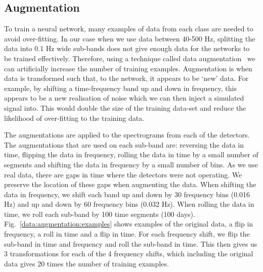 \subsection{\label{data:augmentation} Augmentation}

%
To train a neural network, many examples of data from each class are needed to avoid over-fitting.
In our case when we use data between 40-500 Hz, splitting the data into 0.1 Hz wide sub-bands does not give enough data for the
networks to be trained effectively. Therefore, using a technique called data
augmentation~\cite{patrice1991TangentProp,baird1992DocumentImage} we can
artificially increase the number of training examples.
Augmentation is when data is transformed such that, to the network, it appears to be `new'
data. 
For example, by shifting a time-frequency band up and down in frequency, this appears to be a new realisation of noise which we can then inject a simulated signal into.
This would double the size of the training data-set and reduce the likelihood of over-fitting to the training data. 

%
The augmentations are applied to the spectrograms from each of the detectors.
The augmentations that are used on each sub-band are: reversing the data in
time, flipping the data in frequency, rolling the data in time by a small
number of segments and shifting the data in frequency by a small number of
bins. As we use real data, there are gaps in time where the detectors were not
operating. We preserve the location of these gaps when augmenting the data.
When shifting the data in frequency, we shift each band up and down by 30 frequency bins (0.016 Hz) and up and down by 60 frequency bins (0.032 Hz).
When rolling the data in time, we roll each sub-band by 100 time segments (100 days). 
Fig.~\ref{data:augmentation:examples} shows examples of the original data, a flip in frequency, a roll in time and a flip in time.
For each frequency shift, we flip the sub-band in time and frequency and roll the sub-band in time.
This then gives us 3 transformations for each of the 4 frequency shifts, which including the original data gives 20 times the number of training examples.

